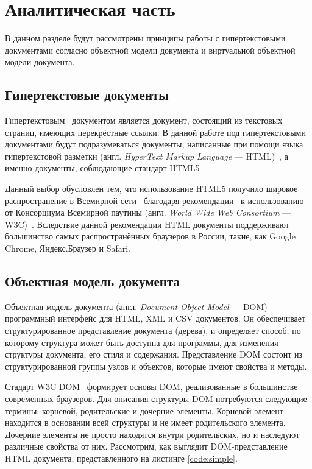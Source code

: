 \section{Аналитическая часть} \label{analysis}

В данном разделе будут рассмотрены принципы работы с гипертекстовыми документами согласно объектной модели документа и виртуальной объектной модели документа.

\subsection{Гипертекстовые документы}

Гипертекстовым~\cite{hypertext} документом является документ, состоящий из текстовых страниц, имеющих перекрёстные ссылки. 
В данной работе под гипертекстовыми документами будут подразумеваться документы, написанные при помощи языка гипертекстовой разметки (англ. \textit{HyperText Markup Language} --- HTML)~\cite{html}, а именно документы, соблюдающие стандарт HTML5~\cite{html-doc}.


Данный выбор обусловлен тем, что использование HTML5 получило широкое распространение в Всемирной сети~\cite{internet} благодаря рекомендации~\cite{html-recommendation} к использованию от Консорциума Всемирной паутины (англ. \textit{World Wide Web \newline Consortium} --- W3C)~\cite{w3c}.
Вследствие данной рекомендации HTML документы поддерживают большинство самых распространённых браузеров в России, такие, как Google Chrome, Яндекс.Браузер и Safari. 

\subsection{Объектная модель документа}

Объектная модель документа (англ. \textit{Document Object Model} --- DOM)~\cite{dom} --- программный интерфейс для HTML, XML и CSV документов. 
Он обеспечивает структурированное представление документа (дерева), и определяет способ, по которому структура может быть доступна для программы, для изменения структуры документа, его стиля и содержания.
Представление DOM состоит из структурированной группы узлов и объектов, которые имеют свойства и методы.

Стадарт W3C DOM~\cite{dom-doc} формирует основы DOM, реализованные в большинстве современных браузеров. 
Для описания структуры DOM потребуются следующие термины: корневой, родительские и дочерние элементы. 
Корневой элемент находится в основании всей структуры и не имеет родительского элемента.
Дочерние элементы не просто находятся внутри родительских, но и наследуют различные свойства от них.
Рассмотрим, как выглядит DOM-представление HTML документа, представленного на листинге \ref{code:simple}. 

